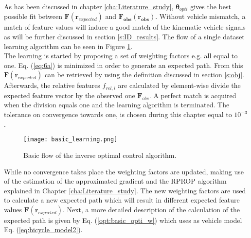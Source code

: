 
As has been discussed in chapter \ref{cha:Literature_study},  $\bm{\theta}_{opti}$ gives the best possible fit between $\bm{F}(\bm{r}_{expected})$ and $\bm{F_{obs}(\bm{r}_{obs})}$.
Without vehicle mismatch, a match of feature values will induce a good match of the kinematic vehicle signals as will be further discussed in section \ref{s:ID_results}.
The flow of a single dataset learning algorithm can be seen in Figure \ref{fig:basic learning}.\\


The learning is started by proposing a set of weighting factors e.g. all equal to one. Eq. (\ref{eq:6a})  is minimized in order to generate an expected path. From this $\bm{F}(\bm{r}_{expected})$ can be retrieved by using the definition discussed in section \ref{s:obj}. Afterwards, the relative features $f_{rel,i}$ are calculated by element-wise  divide  the expected feature vector by the observed one $\bm{F}_{obs}$. A perfect match is acquired when the division equals one and the learning algorithm is terminated. The tolerance on convergence towards one, is chosen during this chapter equal to $10^{-3}$.\\
\vspace{5mm}

\begin{figure}[h!]
	\centering
	\texttt{[image: basic\_learning.png]}
	\caption{Basic flow of the inverse optimal control algorithm.}
	\label{fig:basic learning}
\end{figure}

  
While no convergence takes place the weighting factors are updated, making use of the estimation of the approximated gradient and the RPROP algorithm explained in Chapter \ref{cha:Literature_study}. The new weighting factors are used to calculate a new expected path which will result in different expected feature values $\bm{F}(\bm{r}_{expected})$.  Next, a more detailed description of the calculation of the expected path is given by Eq. (\ref{opt:basic_opti_w}) which uses as vehicle model Eq. (\ref{eq:bicycle_model2}). \\

